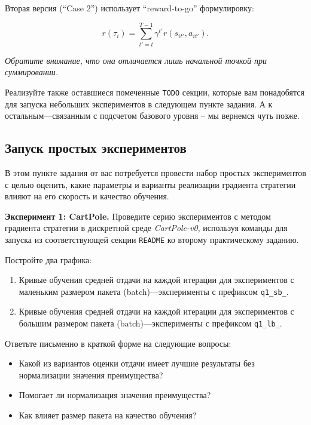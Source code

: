 \documentclass[12pt, oneside]{article}
\begin{document}
\noindent
Вторая версия (``Case 2'') использует ``reward-to-go'' формулировку:

\begin{equation}
    r(\tau_i) = \sum_{t' = t}^{T - 1} {\gamma^{t'} r(s_{it'}, a_{it'})}.
\end{equation}

\noindent
\textit{Обратите внимание, что она отличается лишь начальной точкой при суммировании.}

Реализуйте также оставшиеся помеченные \verb|TODO| секции, которые вам понадобятся для запуска небольших экспериментов в следующем пункте задания. А к остальным---связанным с подсчетом базового уровня -- мы вернемся чуть позже.

\subsection{Запуск простых экспериментов}

В этом пункте задания от вас потребуется провести набор простых экспериментов с целью оценить, какие параметры и варианты реализации градиента стратегии влияют на его скорость и качество обучения.

\textbf{Эксперимент 1: CartPole.} Проведите серию экспериментов с методом градиента стратегии в дискретной среде \textit{CartPole-v0}, используя команды для запуска из соответствующей секции \verb|README| ко второму практическому заданию.

Постройте два графика:

\begin{enumerate}
    \item Кривые обучения средней отдачи на каждой итерации для экспериментов с маленьким размером пакета (batch)---эксперименты с префиксом \verb|q1_sb_|.
    \item Кривые обучения средней отдачи на каждой итерации для экспериментов с большим размером пакета (batch)---эксперименты с префиксом \verb|q1_lb_|.
\end{enumerate}

Ответьте письменно в краткой форме на следующие вопросы:

\begin{itemize}
    \item Какой из вариантов оценки отдачи имеет лучшие результаты без нормализации значения преимущества?
    \item Помогает ли нормализация значения преимущества?
    \item Как влияет размер пакета на качество обучения?
\end{itemize}
\end{document}
